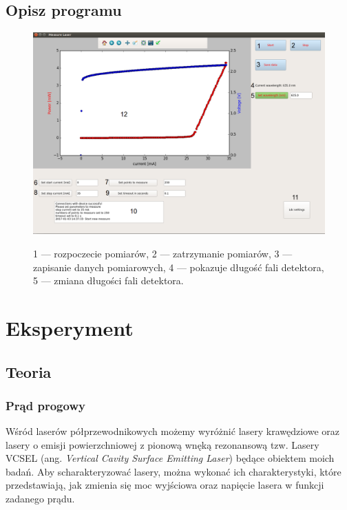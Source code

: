 \documentclass[a4paper, portrait,12pt]{report}
\begin{document}
\section{Opisz programu}
\begin{figure}[h]
\center
  \includegraphics[scale=0.35]{gui.png}
  \label{rys1}
  \caption{1 --- rozpoczecie pomiarów, 2 --- zatrzymanie pomiarów, 3 --- zapisanie danych pomiarowych, 4 --- pokazuje długość fali detektora, 5 --- zmiana długości fali detektora.} 
\end{figure}
\chapter{Eksperyment} \label{Eksperyment}
\section{Teoria}
\subsection{Prąd progowy}
Wśród laserów półprzewodnikowych możemy wyróżnić lasery krawędziowe oraz lasery o emisji powierzchniowej z pionową wnęką rezonansową tzw. Lasery VCSEL (ang. \textit{Vertical Cavity Surface Emitting Laser}) będące obiektem moich badań. Aby scharakteryzować lasery, można wykonać ich charakterystyki, które przedstawiają, jak zmienia się moc wyjściowa oraz napięcie lasera w funkcji zadanego prądu.
\end{document}
